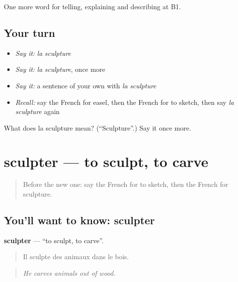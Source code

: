 \begin{grammarlens}[title={What you've built}]
One more word for telling, explaining and describing at B1.
\end{grammarlens}

\subsection*{Your turn}
\begin{itemize}
\raggedright
  \item \emph{Say it:} \emph{la sculpture}
  \item \emph{Say it:} \emph{la sculpture}, once more
  \item \emph{Say it:} a sentence of your own with \emph{la sculpture}
  \item \emph{Recall:} say the French for easel, then the French for to sketch, then say \emph{la sculpture} again
\end{itemize}

\begin{tcolorbox}[breakable,colback=teal!4,colframe=teal!35!black,title={Before you move on}]
What does la sculpture mean? (\textquotedblleft{}Sculpture\textquotedblright{}.) Say it once more.
\end{tcolorbox}
\section[sculpter]{sculpter — to sculpt, to carve}

\label{lesson:FR-C517-sculpter}



\begin{quote}
Before the new one: say the French for to sketch, then the French for sculpture.
\end{quote}

\subsection*{You'll want to know: sculpter}
\textbf{sculpter} — \textquotedblleft{}to sculpt, to carve\textquotedblright{}.

\begin{quote}
Il sculpte des animaux dans le bois.
\end{quote}

\begin{quote}
\emph{He carves animals out of wood.}
\end{quote}

